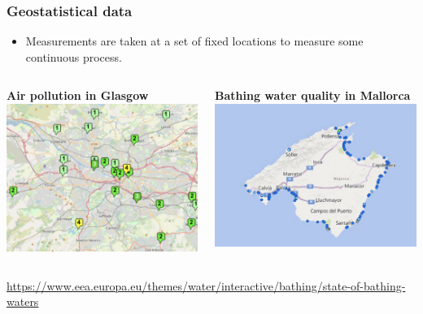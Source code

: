 \documentclass[parskip,12pt]{beamer}
\begin{document}
\begin{frame}
\frametitle{Geostatistical data}
 \begin{itemize}
\vspace{3mm}
\item Measurements are taken at a set of fixed locations to measure some continuous process.
\end{itemize}
\begin{columns}
\begin{column}{0.5\textwidth}
    \begin{center}
    \textbf{Air pollution in Glasgow}
     \includegraphics[width=\textwidth]{GlasgowMap}
          \end{center}
\end{column}
\begin{column}{0.5\textwidth}
    \begin{center}
    \textbf{Bathing water quality in Mallorca}
     \includegraphics[width=\textwidth]{MallorcaBeaches}
          \end{center}
\end{column}
\end{columns}
\vspace{2mm}
\footnotesize{\url{https://www.eea.europa.eu/themes/water/interactive/bathing/state-of-bathing-waters}}
\end{frame}
\end{document}
